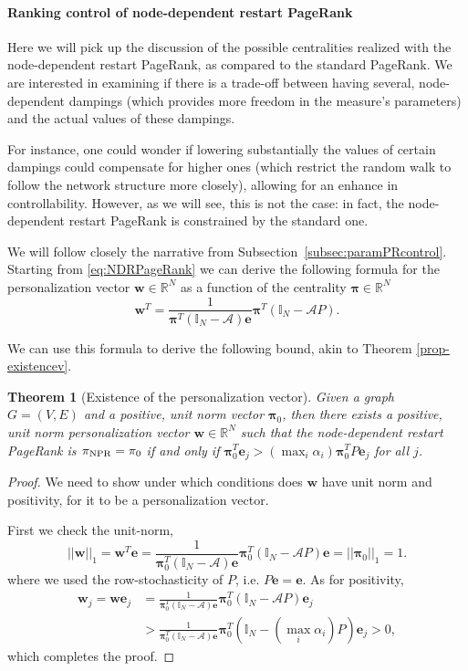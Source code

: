 \documentclass[sn-mathphys-ay]{sn-jnl}%
\newcommand{\R}{\mathbb{R}}
\newcommand{\I}{\mathbb{I}}
\newcommand{\bw}{\bm{w}}
\newcommand{\be}{\mathbf{e}}
\newcommand{\cA}{\mathcal{A}}
\def\nn{\nonumber}
\theoremstyle{thmstyleone}%
\newtheorem{theorem}{Theorem}%
\theoremstyle{thmstyletwo}%
\theoremstyle{thmstylethree}%
\begin{document}
\paragraph{Ranking control of node-dependent restart PageRank}

Here we will pick up the discussion of the possible centralities realized with the node-dependent restart PageRank, as compared to the standard PageRank. We are interested in examining if there is a trade-off between having several, node-dependent dampings (which provides more freedom in the measure's parameters) and the actual values of these dampings.

For instance, one could wonder if lowering substantially the values of certain dampings could compensate for higher ones (which restrict the random walk to follow the network structure more closely), allowing for an enhance in controllability. However, as we will see, this is not the case: in fact, the node-dependent restart PageRank is  constrained by the standard one.

We will follow closely the narrative from Subsection~\ref{subsec:paramPRcontrol}. Starting from \eqref{eq:NDRPageRank} we can derive the following formula for the personalization vector $\bw\in\R^N$ as a function of the centrality $\bm{\pi}\in\R^N$
\begin{equation}
	\bw^T=\frac{1}{\bm{\pi}^T(\I_N-\cA )\be} \bm{\pi}^T(\I_N - \cA P).
\end{equation}

We can use this formula to derive the following bound, akin to Theorem \ref{prop-existencev}.
\begin{theorem}[Existence of the personalization vector]\label{thm:prop-existencev-ndpr}
	Given a graph $G=(V,E)$ and a positive, unit norm vector $\bm{\pi}_0$, then there exists a positive, unit norm personalization vector $\bw\in\R^N$ such that the node-dependent restart PageRank is $\pi_{\rm NPR}=\pi_0$ if and only if $\bm{\pi}^T_0 \be_j > (\max_i{\alpha_i}) \bm{\pi}^T_0 P \be_j$ for all $j$.
\end{theorem}

\begin{proof}
	We need to show under which conditions does $\bw$ have unit norm and positivity, for it to be a personalization vector. 
	
	First we check the unit-norm, 
	\begin{equation}
		||\bw||_1=\bw^T\be = \frac{1}{\bm{\pi}_0^T(\I_N-\cA )\be} \bm{\pi}_0^T(\I_N - \cA P)\be = ||\bm{\pi}_0||_1=1.
	\end{equation}
	where we used the row-stochasticity of $P$, i.e. $P\be=\be$. As for positivity,
	\begin{align}
		\bw_j = \bw \be_j &= \frac{1}{\bm{\pi}_0^T(\I_N-\cA )\be} \bm{\pi}_0^T(\I_N - \cA P)\be_j \nn \\ &>\frac{1}{\bm{\pi}_0^T(\I_N-\cA )\be} \bm{\pi}_0^T(\I_N - (\max_i{\alpha}_i) P)\be_j > 0,
	\end{align}
	which completes the proof.
\end{proof}
\end{document}
